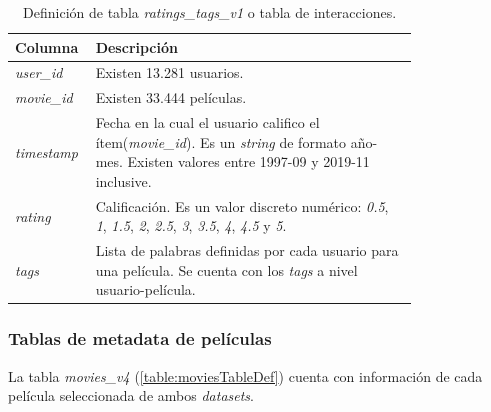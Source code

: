 \documentclass[11pt,a4paper,twoside]{thesis}
\begin{document}
\begin{table}[!htb]
	\centering
	\footnotesize
	\begin{tabular}{l | p{0.8\linewidth}}
		\hline
		Columna            & Descripción                                                                                                                                                                     \\
		\hline

		\textit{user\_id}  & Existen 13.281 usuarios.                                                                                                                                                        \\
		\textit{movie\_id} & Existen 33.444 películas.                                                                                                                                                       \\
		\textit{timestamp} & Fecha en la cual el usuario califico el ítem(\textit{movie\_id}). Es un \textit{string} de formato año-mes. Existen valores entre 1997-09 y 2019-11 inclusive.                  \\
		\textit{rating}    & Calificación. Es un valor discreto numérico: \textit{0.5}, \textit{1}, \textit{1.5}, \textit{2}, \textit{2.5}, \textit{3}, \textit{3.5}, \textit{4}, \textit{4.5} y \textit{5}. \\
		\textit{tags}      & Lista de palabras definidas por cada usuario para una película. Se cuenta con los \textit{tags} a nivel usuario-película.                                                       \\
		\hline
	\end{tabular}
	\caption{
		Definición de tabla \textit{ratings\_tags\_v1} o tabla de interacciones.
	}
	\label{table:interactionsTableDef}
\end{table}

\subsubsection*{Tablas de metadata de películas}

La tabla \textit{movies\_v4} (\ref{table:moviesTableDef}) cuenta con
información de cada película seleccionada de ambos \textit{datasets}.
\end{document}
